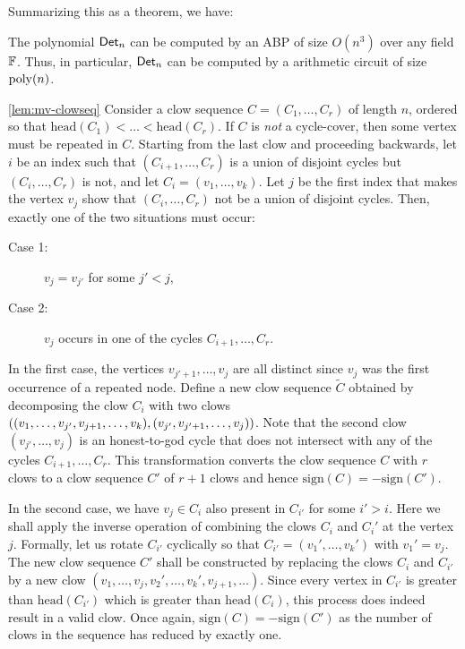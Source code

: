 \noindent
Summarizing this as a theorem, we have:

\begin{theorem}[\cite{mv97}]\label{thm:det-abp}
The polynomial $\operatorname{\mathsf{Det}}_n$ can be computed by an ABP of size $O(n^3)$ over any field $\mathbb{F}$. 
Thus, in particular, $\operatorname{\mathsf{Det}}_n$ can be computed by a arithmetic circuit of size $\operatorname{poly}(n)$. 
\end{theorem}


\begin{proofof}{\autoref{lem:mv-clowseq}}
Consider a clow sequence $C = (C_1,\dots, C_r)$ of length $n$, ordered so that $\mathrm{head}(C_1) < \dots < \mathrm{head}(C_r)$. 
If $C$ is \emph{not} a cycle-cover, then some vertex must be repeated in $C$. 
Starting from the last clow and proceeding backwards, let $i$ be an index such that $(C_{i+1},\dots, C_{r})$ is a union of disjoint cycles but $(C_{i},\dots, C_r)$ is not, and let $C_i = (v_1,\dots, v_k)$. 
Let $j$ be the first index that makes the vertex $v_{j}$ show that $(C_i,\dots, C_r)$ not be a union of disjoint cycles. 
Then, exactly one of the two situations must occur:
\begin{description}
 \item[Case 1:] $v_{j} = v_{j'}$ for some $j' < j$,

 \item[Case 2:] $v_{j}$ occurs in one of the cycles $C_{i+1},\dots, C_r$. 
\end{description}

In the first case, the vertices $v_{j'+1},\dots, v_{j}$ are all distinct since $v_j$ was the first occurrence of a repeated node. 
Define a new clow sequence  $\tilde{C}$ obtained by decomposing the clow $C_i$ with two clows $\left((v_1,\dots, v_{j'},v_{j+1},\dots, v_k), (v_{j'},v_{j'+1},\dots,v_{j})\right)$. 
Note that the second clow $(v_{j'},\dots, v_j)$ is an honest-to-god cycle that does not intersect with any of the cycles $C_{i+1},\dots, C_r$. 
This transformation converts the clow sequence $C$ with $r$ clows to a clow sequence $C'$ of $r+1$ clows and hence $\mathrm{sign}(C) = - \mathrm{sign}(C')$. 

In the second case, we have $v_j \in C_i$ also present in $C_{i'}$ for some $i' > i$. 
Here we shall apply the inverse operation of combining the clows $C_i$ and $C_i'$ at the vertex $j$. 
Formally, let us rotate $C_{i'}$ cyclically so that $C_{i'} = (v_1',\dots, v_k')$ with $v_1' = v_j$. 
The new clow sequence $C'$ shall be constructed by replacing the clows $C_i$ and $C_{i'}$ by a new clow $(v_1,\dots, v_j, v_2',\dots, v_k', v_{j+1},\dots)$. 
Since every vertex in $C_{i'}$ is greater than $\mathrm{head}(C_{i'})$ which is greater than $\mathrm{head}(C_i)$, this process does indeed result in a valid clow. 
Once again, $\mathrm{sign}(C) = - \mathrm{sign}(C')$ as the number of clows in the sequence has reduced by exactly one.\\


\end{proofof}
